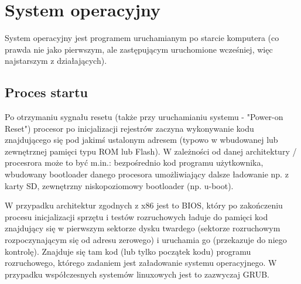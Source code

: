 % 
% 
% 
% 

\section{System operacyjny}

System operacyjny jest programem uruchamianym po starcie komputera (co prawda nie jako pierwszym, ale zastępującym uruchomione wcześniej, więc najstarszym z działających).

\subsection{Proces startu}

Po otrzymaniu sygnału resetu (także przy uruchamianiu systemu - "Power-on Reset") procesor po inicjalizacji rejestrów zaczyna wykonywanie kodu znajdującego się pod jakimś ustalonym adresem (typowo w wbudowanej lub zewnętrznej pamięci typu ROM lub Flash). W zależności od danej architektury / procesrora może to być m.in.: bezpośrednio kod programu użytkownika, wbudowany bootloader danego procesora umożliwiający dalsze ładowanie np. z karty SD, zewnętrzny niskopoziomowy bootloader (np. u-boot).

W przypadku architektur zgodnych z x86 jest to BIOS, który po zakończeniu procesu inicjalizacji sprzętu i testów rozruchowych ładuje do pamięci kod znajdujący się w pierwszym sektorze dysku twardego (sektorze rozruchowym rozpoczynającym się od adresu zerowego) i uruchamia go (przekazuje do niego kontrolę). Znajduje się tam kod (lub tylko początek kodu) programu rozruchowego, którego zadaniem jest załadowanie systemu operacyjnego. W przypadku współczesnych systemów linuxowych jest to zazwyczaj GRUB.

